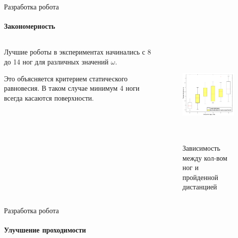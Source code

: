 \documentclass[aspectratio=169,xcolor=table]{beamer}
\begin{document}
\begin{frame}[t]{Разработка робота}
    \framesubtitle{Закономерность}
    \begin{columns}[T,onlytextwidth]
        \begin{column}{0.49\textwidth}
            Лучшие роботы в экспериментах начинались с 8 до 14 ног для различных значений $\omega$. 
            
            Это объясняется критерием статического равновесия. В таком случае минимум 4 ноги всегда касаются поверхности.    
        \end{column}
        \begin{column}{0.49\textwidth}
            \vspace{-1.8cm}
            \begin{figure}[H]
                \centering\includegraphics[height=5cm,width=1\textwidth,keepaspectratio]{box_plot_structural_synthesis.png}
                \caption*{Зависимость между кол-вом ног и пройденной дистанцией}
                \label{fig:box_plot_structural_synthesis.png}
            \end{figure}
        \end{column}
    \end{columns}
\end{frame}

\begin{frame}[t]{Разработка робота}
    \framesubtitle{Улучшение проходимости}
\end{frame}
\end{document}
